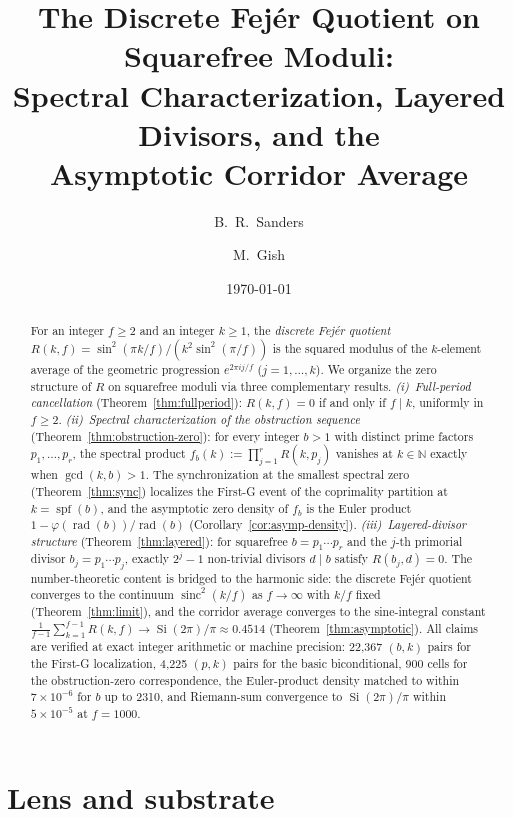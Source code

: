 \documentclass[11pt,reqno]{amsart}
\title[The discrete Fej\'{e}r quotient on squarefree moduli]%
{The Discrete Fej\'{e}r Quotient on Squarefree Moduli:\\
 Spectral Characterization, Layered Divisors, and the\\
 Asymptotic Corridor Average}
\author{B.~R.~Sanders}
\author{M.~Gish}
\date{\today}
\theoremstyle{plain}
\theoremstyle{definition}
\theoremstyle{remark}
\DeclareMathOperator{\spf}{spf}
\DeclareMathOperator{\sinc}{sinc}
\DeclareMathOperator{\rad}{rad}
\DeclareMathOperator{\Si}{Si}
\newcommand{\N}{\mathbb{N}}
\begin{document}
\begin{abstract}
For an integer $f \ge 2$ and an integer $k \ge 1$, the
\emph{discrete Fej\'{e}r quotient}
$R(k, f) = \sin^{2}(\pi k/f) / (k^{2} \sin^{2}(\pi/f))$ is the
squared modulus of the $k$-element average of the geometric progression
$e^{2\pi i j/f}$ ($j = 1, \dots, k$). We organize the zero structure of
$R$ on squarefree moduli via three complementary results.
\emph{(i)~Full-period cancellation} (Theorem~\ref{thm:fullperiod}):
$R(k, f) = 0$ if and only if $f \mid k$, uniformly in $f \ge 2$.
\emph{(ii)~Spectral characterization of the obstruction sequence}
(Theorem~\ref{thm:obstruction-zero}): for every integer $b > 1$ with
distinct prime factors $p_{1}, \dots, p_{r}$, the spectral product
$f_{b}(k) := \prod_{j=1}^{r} R(k, p_{j})$ vanishes at $k \in \N$
exactly when $\gcd(k, b) > 1$. The synchronization at the smallest
spectral zero (Theorem~\ref{thm:sync}) localizes the First-G event of
the coprimality partition at $k = \spf(b)$, and the asymptotic zero
density of $f_{b}$ is the Euler product
$1 - \varphi(\rad(b))/\rad(b)$ (Corollary~\ref{cor:asymp-density}).
\emph{(iii)~Layered-divisor structure} (Theorem~\ref{thm:layered}):
for squarefree $b = p_{1} \cdots p_{r}$ and the $j$-th primorial
divisor $b_{j} = p_{1} \cdots p_{j}$, exactly $2^{j} - 1$ non-trivial
divisors $d \mid b$ satisfy $R(b_{j}, d) = 0$. The number-theoretic
content is bridged to the harmonic side: the discrete Fej\'{e}r
quotient converges to the continuum
$\sinc^{2}(k/f)$ as $f \to \infty$ with $k/f$ fixed
(Theorem~\ref{thm:limit}), and the corridor average converges to
the sine-integral constant
$\frac{1}{f-1}\sum_{k=1}^{f-1} R(k, f) \to \Si(2\pi)/\pi
\approx 0.4514$ (Theorem~\ref{thm:asymptotic}). All claims are
verified at exact integer arithmetic or machine precision: 22{,}367
$(b, k)$ pairs for the First-G localization, 4{,}225 $(p, k)$ pairs
for the basic biconditional, 900 cells for the obstruction-zero
correspondence, the Euler-product density matched to within
$7 \times 10^{-6}$ for $b$ up to 2310, and Riemann-sum convergence
to $\Si(2\pi)/\pi$ within $5 \times 10^{-5}$ at $f = 1000$.
\end{abstract}

\maketitle

\section*{Lens and substrate}\label{sec:lens}
\end{document}
